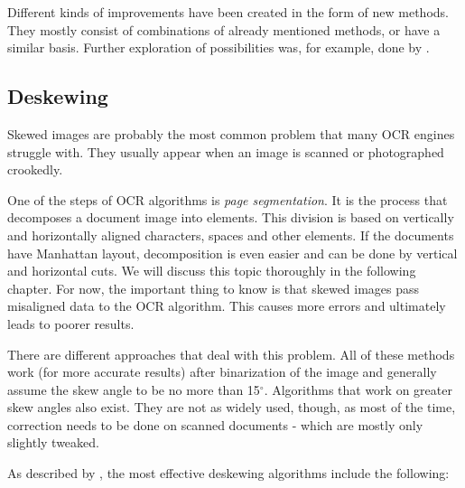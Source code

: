 Different kinds of improvements have been created in the form of new methods. They mostly consist of combinations of already mentioned methods, or have a similar basis. Further exploration of possibilities was, for example, done by \citet{localOtherBin}.

\subsection{Deskewing}

Skewed images are probably the most common problem that many OCR engines struggle with. They usually appear when an image is scanned or photographed crookedly. 

One of the steps of OCR algorithms is \emph{page segmentation}. It is the process that decomposes a document image into elements. This division is based on vertically and horizontally aligned characters, spaces and other elements. If the documents have Manhattan layout, decomposition is even easier and can be done by vertical and horizontal cuts. We will discuss this topic thoroughly in the following chapter. For now, the important thing to know is that skewed images pass misaligned data to the OCR algorithm. This causes more errors and ultimately leads to poorer results.

There are different approaches that deal with this problem. All of these methods work (for more accurate results) after binarization of the image and generally assume the skew angle to be no more than 15$^{\circ}$. Algorithms that work on greater skew angles also exist\citep{skewAngleDetection}. They are not as widely used, though, as most of the time, correction needs to be done on scanned documents - which are mostly only slightly tweaked.

As described by \citet{skewBestTechniques}, the most effective deskewing algorithms include the following:

